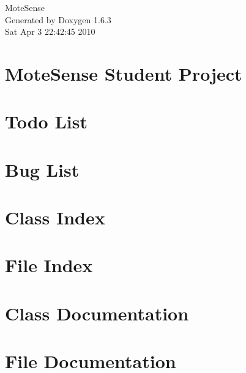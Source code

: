\documentclass[a4paper]{book}
\begin{document}
\hypersetup{pageanchor=false}
\begin{titlepage}
\vspace*{7cm}
\begin{center}
{\Large MoteSense }\\
\vspace*{1cm}
{\large Generated by Doxygen 1.6.3}\\
\vspace*{0.5cm}
{\small Sat Apr 3 22:42:45 2010}\\
\end{center}
\end{titlepage}
\clearemptydoublepage
{}
\tableofcontents
\clearemptydoublepage
{}
\hypersetup{pageanchor=true}
\chapter{MoteSense Student Project}
\label{index}\hypertarget{index}{}
\chapter{Todo List}
\label{todo}
\hypertarget{todo}{}

\chapter{Bug List}
\label{bug}
\hypertarget{bug}{}

\chapter{Class Index}

\chapter{File Index}

\chapter{Class Documentation}





\chapter{File Documentation}











\printindex
\end{document}
